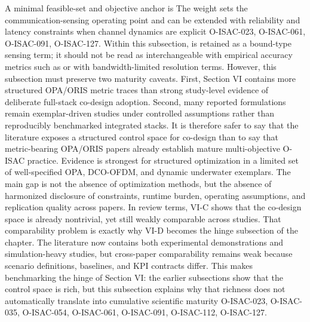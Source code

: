 {}A minimal feasible-set and objective anchor is\markdownRendererParagraphSeparator
{}\markdownRendererSoftLineBreak
{}\markdownRendererParagraphSeparator
{}The weight \markdownRendererInlineMath{\alpha} sets the communication-sensing operating point and can be extended with reliability and latency constraints when channel dynamics are explicit O-ISAC-023, O-ISAC-061, O-ISAC-091, O-ISAC-127. Within this subsection,  is retained as a bound-type sensing term; it should not be read as interchangeable with empirical accuracy metrics such as  or with bandwidth-limited resolution terms. However, this subsection must preserve two maturity caveats. First, Section VI contains more structured OPA/ORIS metric traces than strong study-level evidence of deliberate full-stack co-design adoption. Second, many reported formulations remain exemplar-driven studies under controlled assumptions rather than reproducibly benchmarked integrated stacks. It is therefore safer to say that the literature exposes a structured control space for co-design than to say that metric-bearing OPA/ORIS papers already establish mature multi-objective O-ISAC practice.\markdownRendererParagraphSeparator
{} Evidence is strongest for structured optimization in a limited set of well-specified OPA, DCO-OFDM, and dynamic underwater exemplars. The main gap is not the absence of optimization methods, but the absence of harmonized disclosure of constraints, runtime burden, operating assumptions, and replication quality across papers. In review terms, VI-C shows that the co-design space is already nontrivial, yet still weakly comparable across studies. That comparability problem is exactly why VI-D becomes the hinge subsection of the chapter.\markdownRendererInterblockSeparator
{}
\markdownRendererSectionEnd \markdownRendererSectionBegin
{}\markdownRendererInterblockSeparator
{}The literature now contains both experimental demonstrations and simulation-heavy studies, but cross-paper comparability remains weak because scenario definitions, baselines, and KPI contracts differ. This makes benchmarking the hinge of Section VI: the earlier subsections show that the control space is rich, but this subsection explains why that richness does not automatically translate into cumulative scientific maturity O-ISAC-023, O-ISAC-035, O-ISAC-054, O-ISAC-061, O-ISAC-091, O-ISAC-112, O-ISAC-127.\markdownRendererParagraphSeparator
